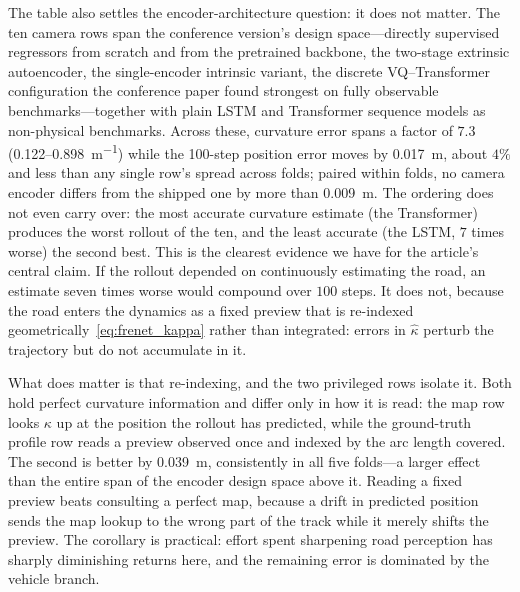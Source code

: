 \documentclass[preprint,12pt]{elsarticle}
\begin{document}
The table also settles the encoder-architecture question: it does not matter.
The ten camera rows span the conference version's design space---directly
supervised regressors from scratch and from the pretrained backbone, the two-stage
extrinsic autoencoder, the single-encoder intrinsic variant, the discrete
VQ--Transformer configuration the conference paper found strongest on fully
observable benchmarks---together with plain LSTM and Transformer sequence models
as non-physical benchmarks.
Across these, curvature error spans a factor of $7.3$
(\SI{0.122}{}--\SI{0.898}{m^{-1}}) while the 100-step position error moves by
\SI{0.017}{m}, about $4\%$ and less than any single row's spread across folds;
paired within folds, no camera encoder differs from the shipped one by more than
\SI{0.009}{m}.
The ordering does not even carry over: the most accurate curvature estimate (the
Transformer) produces the worst rollout of the ten, and the least accurate (the
LSTM, $7$ times worse) the second best.
This is the clearest evidence we have for the article's central claim.
If the rollout depended on continuously estimating the road, an estimate seven
times worse would compound over $100$ steps. It does not, because the road enters
the dynamics as a fixed preview that is re-indexed
geometrically~\eqref{eq:frenet_kappa} rather than integrated: errors in
$\hat{\kappa}$ perturb the trajectory but do not accumulate in it.

What does matter is that re-indexing, and the two privileged rows isolate it. Both
hold perfect curvature information and differ only in how it is read: the map row
looks $\kappa$ up at the position the rollout has predicted, while the ground-truth
profile row reads a preview observed once and indexed by the arc length covered. The
second is better by \SI{0.039}{m}, consistently in all five folds---a larger effect
than the entire span of the encoder design space above it. Reading a fixed preview
beats consulting a perfect map, because a drift in predicted position sends the map
lookup to the wrong part of the track while it merely shifts the preview.
The corollary is practical: effort spent sharpening road perception has sharply
diminishing returns here, and the remaining error is dominated by the vehicle branch.
\end{document}

